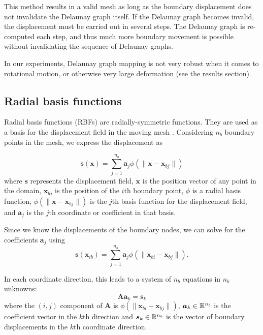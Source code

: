  This method results in a valid mesh as long as the boundary displacement does not invalidate the Delaunay graph itself. If the Delaunay graph becomes invalid, the displacement must be carried out in several steps. The Delaunay graph is re-computed each step, and thus much more boundary movement is possible without invalidating the sequence of Delaunay graphs.
 
 In our experiments, Delaunay graph mapping is not very robust when it comes to rotational motion, or otherwise very large deformation (see the results section).
 
 \subsection{Radial basis functions}
 
 Radial basis functions (RBFs) are radially-symmetric functions. They are used as a basis for the displacement field in the moving mesh \cite{mm:rbf}. Considering $n_b$ boundary points in the mesh, we express the displacement as
 
 \begin{equation}
 \mathbf{s}(\mathbf{x}) = \sum_{j=1}^{n_b} \mathbf{a}_j \phi(\lVert\mathbf{x} - \mathbf{x}_{bj}\rVert)
 \label{eqn:rbf}
 \end{equation}
 where $\mathbf{s}$ represents the displacement field, $\mathbf{x}$ is the position vector of any point in the domain, $\mathbf{x}_{bj}$ is the position of the $i$th boundary point, $\phi$ is a radial basis function, $\phi(\lVert\mathbf{x} - \mathbf{x}_{bj}\rVert)$ is the $j$th basis function for the displacement field, and $\mathbf{a}_j$ is the $j$th coordinate or coefficient in that basis.
 
 Since we know the displacements of the boundary nodes, we can solve for the coefficients $\mathbf{a}_j$ using
 \begin{equation}
 \mathbf{s}(\mathbf{x}_{ib}) = \sum_{j=1}^{n_b} \mathbf{a}_j \phi(\lVert\mathbf{x}_{bi} - \mathbf{x}_{bj}\rVert).
 \end{equation}
 
 In each coordinate direction, this leads to a system of $n_b$ equations in $n_b$ unknowns:
 \begin{equation}
 \mathbf{A}\mathbf{a}_k = \mathbf{s}_k
 \label{eqn:rbf_system}
 \end{equation}
 where the $(i,j)$ component of $\mathbf{A}$ is $\phi(\lVert\mathbf{x}_{bi} - \mathbf{x}_{bj} \rVert)$, $ \boldsymbol{a}_k \in \mathbb{R}^{n_b}$ is the coefficient vector in the $k$th direction and $\boldsymbol{s}_k \in \mathbb{R}^{n_b}$ is the vector of boundary displacements in the $k$th coordinate direction.
 
